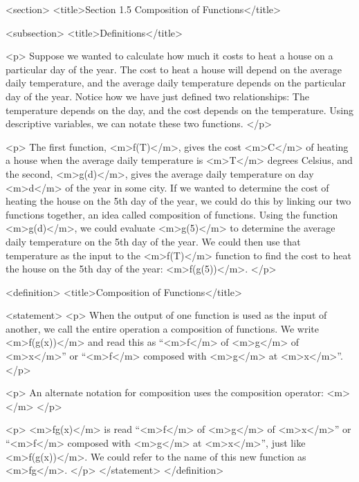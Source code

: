 <section>
    <title>Section 1.5 Composition of Functions</title>

    <subsection>
        <title>Definitions</title>

        <p>
            Suppose we wanted to calculate how much it costs to heat a house on a particular day of the year.
            The cost to heat a house will depend on the average daily temperature, and the average daily temperature depends on the particular day of the year.
            Notice how we have just defined two relationships: The temperature depends on the day, and the cost depends on the temperature.
            Using descriptive variables, we can notate these two functions.
        </p>

        <p>
            The first function, <m>f(T)</m>, gives the cost <m>C</m> of heating a house when the average daily temperature is <m>T</m> degrees Celsius, and the second, <m>g(d)</m>, gives the average daily temperature on day <m>d</m> of the year in some city.
            If we wanted to determine the cost of heating the house on the 5th day of the year, we could do this by linking our two functions together, an idea called composition of functions.
            Using the function <m>g(d)</m>, we could evaluate <m>g(5)</m> to determine the average daily temperature on the 5th day of the year.
            We could then use that temperature as the input to the <m>f(T)</m> function to find the cost to heat the house on the 5th day of the year: <m>f(g(5))</m>.
        </p>

        <definition>
            <title>Composition of Functions</title>

            <statement>
                <p>
                    When the output of one function is used as the input of another, we call the entire operation a composition of functions.
                    We write <m>f(g(x))</m> and read this as “<m>f</m> of <m>g</m> of <m>x</m>” or “<m>f</m> composed with <m>g</m> at <m>x</m>”.
                </p>

                <p>
                    An alternate notation for composition uses the composition operator: <m>\circ</m>
                </p>

                <p>
                    <m>f\circ g(x)</m> is read “<m>f</m> of <m>g</m> of <m>x</m>” or “<m>f</m> composed with <m>g</m> at <m>x</m>”, just like <m>f(g(x))</m>. We could refer to the name of this new function as <m>f\circ g</m>.
                </p>
            </statement>
        </definition>

